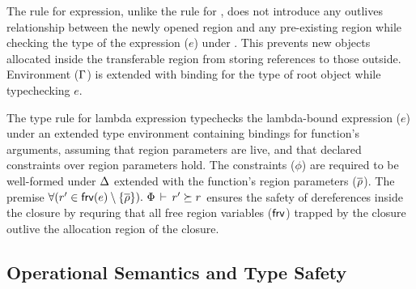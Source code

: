 The rule for  expression, unlike the rule for ,
does not introduce any outlives relationship between the newly opened
region and any pre-existing region while checking the type of the
expression ($e$) under . This prevents new objects allocated
inside the transferable region from storing references to those
outside.  Environment ($\Gamma$) is extended with binding for the type
of root object while typechecking $e$. 

The type rule for lambda expression typechecks
the lambda-bound expression ($e$) under an extended type environment
containing bindings for function's arguments, assuming that region
parameters are live, and that declared constraints over region
parameters hold. The constraints ($\phi$) are required to be
well-formed under $\Delta$ extended with the function's region
parameters ($\overline{\rho}$). The premise $\forall
(r'\in{\sf frv}(e)\setminus\{\overline{\rho}\}). ~\Phi\,\vdash\,r'\succeq r$ ensures the safety of dereferences inside the
closure by requring that all free region variables (${\sf frv}$) trapped by
the closure outlive the allocation region of the closure.



\subsection{Operational Semantics and Type Safety}
\label{sec:fb-opsem}

